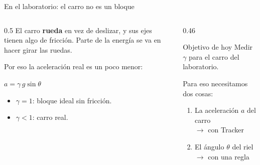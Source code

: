 \documentclass[aspectratio=169,xcolor=dvipsnames]{beamer}
\begin{document}
	\begin{frame}{En el laboratorio: el carro no es un bloque}
		\begin{columns}[T]
			\begin{column}{0.5\textwidth}
				\small
				El carro \textbf{rueda} en vez de deslizar, y sus ejes tienen algo de
				fricción. Parte de la energía se va en hacer girar las ruedas.
				
				\vspace{0.3cm}
				Por eso la aceleración real es un poco menor:
				\begin{exampleblock}{}
					\centering
					\Large $a = \gamma\,g\sin\theta$
				\end{exampleblock}
				
				\vspace{0.2cm}
				\begin{itemize}
					\item $\gamma = 1$: bloque ideal sin fricción.
					\item $\gamma < 1$: carro real.
				\end{itemize}
			\end{column}
			\begin{column}{0.46\textwidth}
				\begin{alertblock}{Objetivo de hoy}
					\centering
					Medir $\gamma$ para el carro del laboratorio.
				\end{alertblock}
				
				\vspace{0.4cm}
				\small
				Para eso necesitamos dos cosas:
				\begin{enumerate}
					\item La aceleración $a$ del carro \\
					\textcolor{nyugray}{$\rightarrow$ con Tracker}
					\item El ángulo $\theta$ del riel \\
					\textcolor{nyugray}{$\rightarrow$ con una regla}
				\end{enumerate}
			\end{column}
		\end{columns}
	\end{frame}
	
\end{document}
